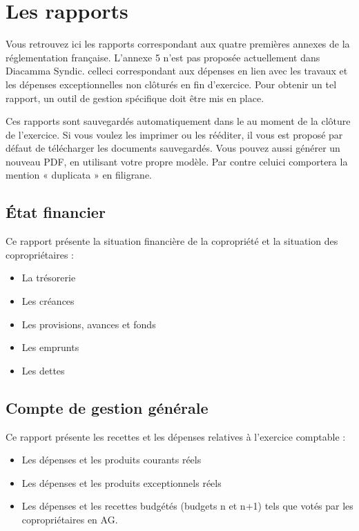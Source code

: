 \documentclass[a4paper,10pt,oneside,french]{sphinxmanual}
\begin{document}
\section{Les rapports}
\label{\detokenize{condominium/report:les-rapports}}\label{\detokenize{condominium/report::doc}}
\sphinxAtStartPar
Vous retrouvez ici les rapports correspondant aux quatre premières annexes de la réglementation française.
L’annexe 5 n’est pas proposée actuellement dans Diacamma Syndic. celle\sphinxhyphen{}ci correspondant aux dépenses en lien avec les travaux et les dépenses exceptionnelles non clôturés en fin d’exercice. Pour obtenir un tel rapport, un outil de gestion spécifique doit être mis en place.

\sphinxAtStartPar
Ces rapports sont sauvegardés automatiquement dans le  au moment de la clôture de l’exercice.
Si vous voulez les imprimer ou les rééditer, il vous est proposé par défaut de télécharger les documents sauvegardés.
Vous pouvez aussi générer un nouveau PDF, en utilisant votre propre modèle.
Par contre celui\sphinxhyphen{}ci comportera la mention « duplicata » en filigrane.


\subsection{État financier}
\label{\detokenize{condominium/report:etat-financier}}
\sphinxAtStartPar
Ce rapport présente la situation financière de la copropriété et la situation des copropriétaires :
\begin{itemize}
\item {} 
\sphinxAtStartPar
La trésorerie

\item {} 
\sphinxAtStartPar
Les créances

\item {} 
\sphinxAtStartPar
Les provisions, avances et fonds

\item {} 
\sphinxAtStartPar
Les emprunts

\item {} 
\sphinxAtStartPar
Les dettes

\end{itemize}


\subsection{Compte de gestion générale}
\label{\detokenize{condominium/report:compte-de-gestion-generale}}
\sphinxAtStartPar
Ce rapport présente les recettes et les dépenses relatives à l’exercice comptable :
\begin{itemize}
\item {} 
\sphinxAtStartPar
Les dépenses et les produits courants réels

\item {} 
\sphinxAtStartPar
Les dépenses et les produits exceptionnels réels

\item {} 
\sphinxAtStartPar
Les dépenses et les recettes budgétés (budgets n et n+1) tels que votés par les copropriétaires en AG.

\end{itemize}
\end{document}
